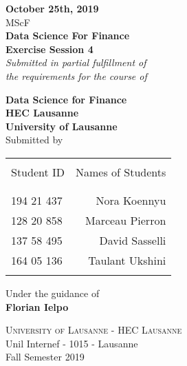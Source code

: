 \begin{titlepage}

\begin{center}

\textup{\small {\bf October 25th, 2019} \\ MScF}\\[0.2in]

\Large \textbf {Data Science For Finance \\ Exercise Session 4}\\[0.5in]

       \small \emph{Submitted in partial fulfillment of\\
        the requirements for the course of}
        \vspace{.2in}

       {\bf Data Science for Finance \\ HEC Lausanne \\ University of Lausanne}\\[0.5in]

\normalsize Submitted by \\
\begin{table}[h]
\centering
\begin{tabular}{lr}\hline \\
Student ID & Names of Students \\ \\ \hline
\\
194 21 437 & Nora Koennyu \\
128 20 858 & Marceau Pierron \\
137 58 495 & David Sasselli \\ 
164 05 136 & Taulant Ukshini \\ \\ \hline 
\end{tabular}
\end{table}

\vspace{.1in}
Under the guidance of\\
{\textbf{Florian Ielpo}}\\[0.2in]

\vfill

\normalsize
\textsc{University of Lausanne - HEC Lausanne}\\
Unil Internef - 1015 - Lausanne \\
\vspace{0.2cm}
Fall Semester 2019

\end{center}

\end{titlepage}
